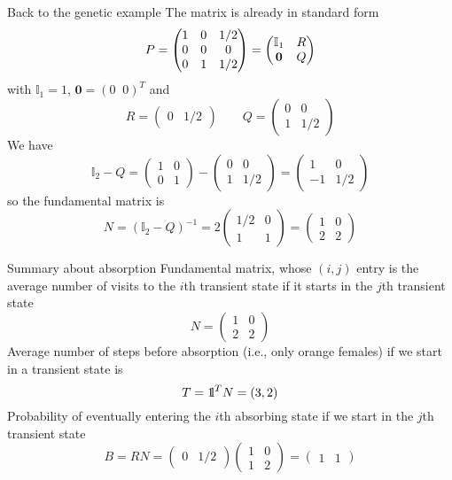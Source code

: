 \documentclass[aspectratio=169]{beamer}\usepackage[]{graphicx}\usepackage[]{xcolor}
\begin{document}
\begin{frame}{Back to the genetic example}
The matrix is already in standard form
\[
P=
\begin{pmatrix}
1 & 0 & 1/2 \\
0 & 0 & 0 \\
0 & 1 & 1/2
\end{pmatrix}
=\begin{pmatrix}
\mathbb{I}_1 & R \\
\b0 & Q
\end{pmatrix}
\]
with $\mathbb{I}_1=1$, $\mathbf{0}=(0\;\; 0)^T$ and
\[
R=\begin{pmatrix}
0 & 1/2
\end{pmatrix}
\qquad
Q=\begin{pmatrix}
0 & 0\\
1 & 1/2
\end{pmatrix}
\]
We have
\[
\mathbb{I}_2-Q=\begin{pmatrix}
1 & 0 \\
0 & 1
\end{pmatrix}
-\begin{pmatrix}
0 & 0\\
1 & 1/2
\end{pmatrix}
=\begin{pmatrix}
1 & 0\\
-1 & 1/2
\end{pmatrix}
\]
so the fundamental matrix is
\[
N=(\mathbb{I}_2-Q)^{-1}=
2
\begin{pmatrix}
1/2 & 0 \\
1 & 1
\end{pmatrix}
=
\begin{pmatrix}
1 & 0 \\
2 & 2
\end{pmatrix}
\]
\end{frame}


\begin{frame}{Summary about absorption}
Fundamental matrix, whose $(i,j)$ entry is the average number of visits to the $i$th transient state if it starts in the $j$th transient state
\[
N=
\begin{pmatrix}
1 & 0 \\
2 & 2
\end{pmatrix}
\]
\vfill
Average number of steps before absorption (i.e., only orange females) if we start in a transient state is
\[
T=\nbOne^TN=(3,2)
\]
\vfill
Probability of eventually entering the $i$th absorbing state if we start in the $j$th transient state
\[
B=RN=
\begin{pmatrix}
	0 & 1/2
\end{pmatrix}
\begin{pmatrix}
1 & 0 \\
1 & 2
\end{pmatrix}
=
\begin{pmatrix}
1 & 1
\end{pmatrix}
\]
\end{frame}
\end{document}
